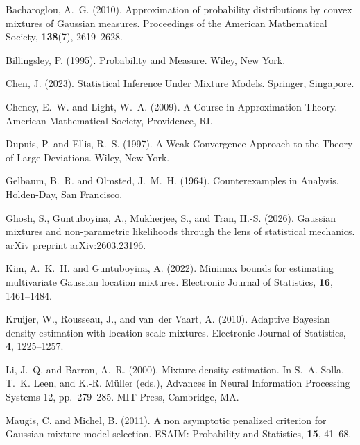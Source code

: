\documentclass[11pt]{article}
\theoremstyle{definition}
\begin{document}
\begin{thebibliography}{}

Bacharoglou, A.~G. (2010).
Approximation of probability distributions by convex mixtures of Gaussian measures.
Proceedings of the American Mathematical Society, \textbf{138}(7), 2619--2628.

Billingsley, P. (1995).
Probability and Measure.
Wiley, New York.

Chen, J. (2023).
Statistical Inference Under Mixture Models.
Springer, Singapore.

Cheney, E.~W. and Light, W.~A. (2009).
A Course in Approximation Theory.
American Mathematical Society, Providence, RI.

Dupuis, P. and Ellis, R.~S. (1997).
A Weak Convergence Approach to the Theory of Large Deviations.
Wiley, New York.

Gelbaum, B.~R. and Olmsted, J.~M.~H. (1964).
Counterexamples in Analysis.
Holden-Day, San Francisco.

Ghosh, S., Guntuboyina, A., Mukherjee, S., and Tran, H.-S. (2026).
Gaussian mixtures and non-parametric likelihoods through the lens of statistical mechanics.
arXiv preprint arXiv:2603.23196.

Kim, A.~K.~H. and Guntuboyina, A. (2022).
Minimax bounds for estimating multivariate Gaussian location mixtures.
Electronic Journal of Statistics, \textbf{16}, 1461--1484.

Kruijer, W., Rousseau, J., and van~der Vaart, A. (2010).
Adaptive Bayesian density estimation with location-scale mixtures.
Electronic Journal of Statistics, \textbf{4}, 1225--1257.

Li, J.~Q. and Barron, A.~R. (2000).
Mixture density estimation.
In S.~A. Solla, T.~K. Leen, and K.-R. M\"uller (eds.), Advances in Neural Information Processing Systems 12, pp.~279--285.
MIT Press, Cambridge, MA.

Maugis, C. and Michel, B. (2011).
A non asymptotic penalized criterion for Gaussian mixture model selection.
ESAIM: Probability and Statistics, \textbf{15}, 41--68.


\end{thebibliography}
\end{document}
